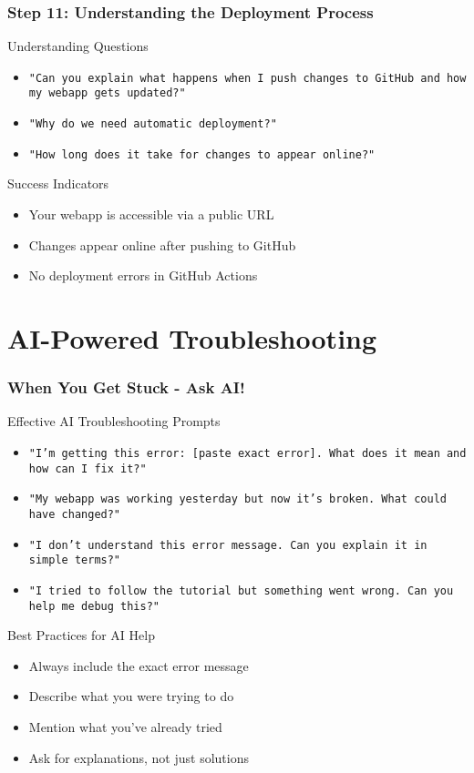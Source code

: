 \documentclass[aspectratio=169]{beamer}
\begin{document}
\begin{frame}
\frametitle{Step 11: Understanding the Deployment Process}
\begin{alertblock}{Understanding Questions}
\begin{itemize}
\item \texttt{"Can you explain what happens when I push changes to GitHub and how my webapp gets updated?"}
\item \texttt{"Why do we need automatic deployment?"}
\item \texttt{"How long does it take for changes to appear online?"}
\end{itemize}
\end{alertblock}

\begin{exampleblock}{Success Indicators}
\begin{itemize}
\item Your webapp is accessible via a public URL
\item Changes appear online after pushing to GitHub
\item No deployment errors in GitHub Actions
\end{itemize}
\end{exampleblock}
\end{frame}

\section{AI-Powered Troubleshooting}

\begin{frame}
\frametitle{When You Get Stuck - Ask AI!}
\begin{alertblock}{Effective AI Troubleshooting Prompts}
\begin{itemize}
\item \texttt{"I'm getting this error: [paste exact error]. What does it mean and how can I fix it?"}
\item \texttt{"My webapp was working yesterday but now it's broken. What could have changed?"}
\item \texttt{"I don't understand this error message. Can you explain it in simple terms?"}
\item \texttt{"I tried to follow the tutorial but something went wrong. Can you help me debug this?"}
\end{itemize}
\end{alertblock}

\begin{exampleblock}{Best Practices for AI Help}
\begin{itemize}
\item Always include the exact error message
\item Describe what you were trying to do
\item Mention what you've already tried
\item Ask for explanations, not just solutions
\end{itemize}
\end{exampleblock}
\end{frame}
\end{document}
